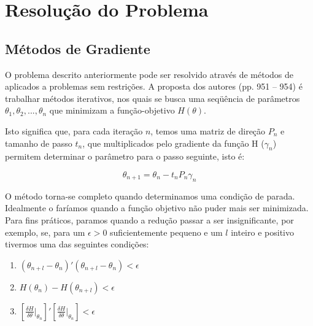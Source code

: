 \documentclass{abnt}
\begin{document}




\chapter{Resolução do Problema}



\section {Métodos de Gradiente}

O problema descrito anteriormente pode ser resolvido através de métodos de aplicados a problemas sem restrições. A proposta dos autores (pp. 951 -- 954) é trabalhar métodos iterativos, nos quais se busca uma seqüência de parâmetros $\theta_{1}, \theta_{2}, ... , \theta_{n}$ que minimizam a função-objetivo  $H(\theta)$.

Isto significa que, para cada iteração $n$, temos uma matriz de direção $P_{n}$ e tamanho de passo $t_{n}$, que multiplicados pelo gradiente da função H ($\gamma_{n}$) permitem determinar o parâmetro para o passo seguinte, isto é:

\[ \theta_{n+1} = \theta_{n} - t_{n}P_{n}\gamma_{n} \]

O método torna-se completo quando determinamos uma condição de parada. Idealmente o faríamos quando a função objetivo não puder mais ser minimizada. Para fins práticos, paramos quando a redução passar a ser insignificante, por exemplo, se, para um $\epsilon > 0$ suficientemente pequeno e um $l$ inteiro e positivo tivermos uma das seguintes condições:

\begin{enumerate}
\item $ ( \theta_{n+l} - \theta_n )'( \theta_{n+l} - \theta_n ) < \epsilon$
\item $ H(  \theta_n )- H (\theta_{n+l} ) < \epsilon$
\item $  [\frac{\delta H}{\delta \theta}\vert_{\theta_n}]'[\frac{\delta H}{\delta \theta}\vert_{\theta_n}] < \epsilon$
\end{enumerate}
\end{document}

